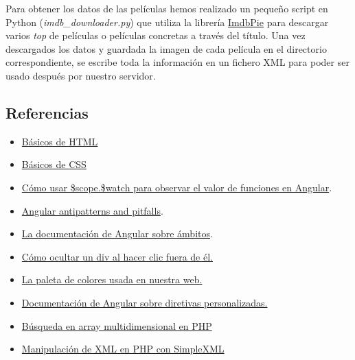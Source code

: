 \documentclass{apuntes}
\begin{document}
Para obtener los datos de las películas hemos realizado un pequeño script en Python (\textit{imdb\_downloader.py}) que utiliza la librería \href{https://github.com/richardasaurus/imdb-pie}{ImdbPie} para descargar varios \textit{top} de películas o películas concretas a través del título. Una vez descargados los datos y guardada la imagen de cada película en el directorio correspondiente, se escribe toda la información en un fichero XML para poder ser usado después por nuestro servidor.

\subsection{Referencias}

\begin{itemize}
	\item \href{http://www.w3schools.com/html/default.asp}{Básicos de HTML}
	\item \href{http://www.w3schools.com/css/default.asp}{Básicos de CSS}
	\item \href{http://www.bennadel.com/blog/2658-using-scope-watch-to-watch-functions-in-angularjs.htm}{Cómo usar \$scope.\$watch para observar el valor de funciones en Angular}.
	\item \href{http://nathanleclaire.com/blog/2014/04/19/5-angularjs-antipatterns-and-pitfalls/}{Angular antipatterns and pitfalls}.
	\item \href{https://github.com/angular/angular.js/wiki/Understanding-Scopes}{La documentación de Angular sobre ámbitos}.
	\item \href{http://stackoverflow.com/questions/17706847/not-sure-how-to-hide-a-div-when-clicking-outside-of-the-div}{Cómo ocultar un div al hacer clic fuera de él.}
	\item \href{http://www.colorcombos.com/color-schemes/22/ColorCombo22.html}{La paleta de colores usada en nuestra web.}
	\item \href{https://docs.angularjs.org/guide/directive}{Documentación de Angular sobre diretivas personalizadas.}
	\item \href{http://stackoverflow.com/questions/6661530/php-multi-dimensional-array-search}{Búsqueda en array multidimensional en PHP}
	\item \href{http://php.net/manual/es/book.simplexml.php}{Manipulación de XML en PHP con SimpleXML}
\end{itemize}
\end{document}

